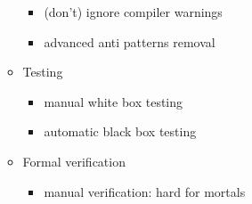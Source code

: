 \begin{frame}
\begin{itemize}
\begin{itemize}
\begin{itemize}
\item (don't) ignore compiler warnings

\item advanced anti patterns removal

\end{itemize}

\item<4-> Testing

\begin{itemize}

\item manual white box testing

\item automatic black box testing

\end{itemize}

\item<5-> Formal verification

\begin{itemize}

\item manual verification: hard for mortals


\end{itemize}
\end{itemize}
\end{itemize}
\end{frame}
